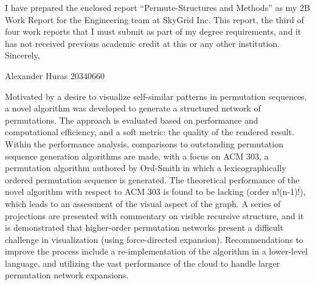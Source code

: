 \documentclass[12pt]{article}
\begin{document}
\begin{waterlooletter}
\indent I have prepared the enclosed report ``Permute-Structures and Methods'' as my 2B Work Report for the Engineering team at SkyGrid Inc. \linebreak[0] This report, the third of four work reports that I must submit as part of my degree requirements, and it has not received previous academic credit at this or any other institution.\\

Sincerely,\\
\vspace{1em}

Alexander Huras
20340660

\end{waterlooletter}

\dotableofcontents

Motivated by a desire to visualize self-similar patterns in permutation sequences, a novel algorithm was developed to generate a structured network of permutations.
The approach is evaluated based on performance and computational efficiency, and a soft metric: the quality of the rendered result.
Within the performance analysis, comparisons to outstanding permutation sequence generation algorithms are made, with a focus on ACM 303, a permutation algorithm authored by Ord-Smith in which a lexicographically ordered permutation sequence is generated.
The theoretical performance of the novel algorithm with respect to ACM 303 is found to be lacking (order n!(n-1)!), which leads to an assessment of the visual aspect of the graph.
A series of projections are presented with commentary on visible recursive structure, and it is demonstrated that higher-order permutation networks present a difficult challenge in visualization (using force-directed expansion).
Recommendations to improve the process include a re-implementation of the algorithm in a lower-level language, and utilizing the vast performance of the cloud to handle larger permutation network expansions.
\newpage
\singlespacing
\end{document}
